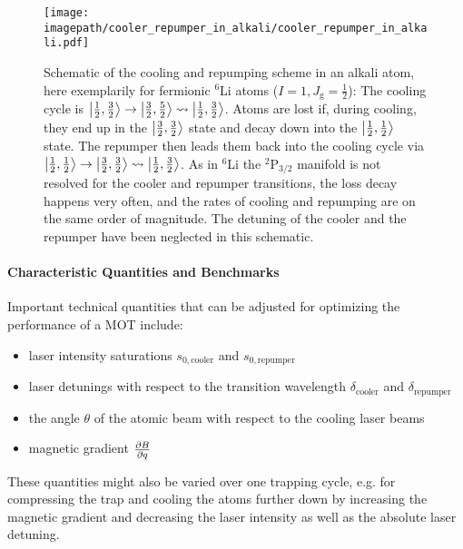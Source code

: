 \begin{figure}
    \centering
    \texttt{[image: \\imagepath/cooler\_repumper\_in\_alkali/cooler\_repumper\_in\_alkali.pdf]}
    \caption{Schematic of the cooling and repumping scheme in an alkali atom, here exemplarily for fermionic $^6$Li atoms ($I = 1, J_\text{g} = \frac{1}{2}$): The cooling cycle is $\Ket{\frac{1}{2}, \frac{3}{2}} \rightarrow \Ket{\frac{3}{2}, \frac{5}{2}} \rightsquigarrow \Ket{\frac{1}{2}, \frac{3}{2}}$. Atoms are lost if, during cooling, they end up in the $\Ket{\frac{3}{2}, \frac{3}{2}}$ state and decay down into the $\Ket{\frac{1}{2}, \frac{1}{2}}$ state. The repumper then leads them back into the cooling cycle via $\Ket{\frac{1}{2}, \frac{1}{2}} \rightarrow \Ket{\frac{3}{2}, \frac{3}{2}} \rightsquigarrow \Ket{\frac{1}{2}, \frac{3}{2}}$. As in $^6$Li the $^2\text{P}_{3/2}$ manifold is not resolved for the cooler and repumper transitions, the loss decay happens very often, and the rates of cooling and repumping are on the same order of magnitude. The detuning of the cooler and the repumper have been neglected in this schematic.}
    \label{fig:cooler_repumper_in_alkali}
\end{figure}

\paragraph{Characteristic Quantities and Benchmarks}
Important technical quantities that can be adjusted for optimizing the performance of a MOT include:
\begin{itemize}
    \item laser intensity saturations $s_{0, \text{cooler}}$ and $s_{0, \text{repumper}}$
    \item laser detunings with respect to the transition wavelength $\delta_\text{cooler}$ and $\delta_\text{repumper}$
    \item the angle $\theta$ of the atomic beam with respect to the cooling laser beams
    \item magnetic gradient $\pdv{B}{q}$
\end{itemize}

These quantities might also be varied over one trapping cycle, e.g. for compressing the trap and cooling the atoms further down by increasing the magnetic gradient and decreasing the laser intensity as well as the absolute laser detuning.

